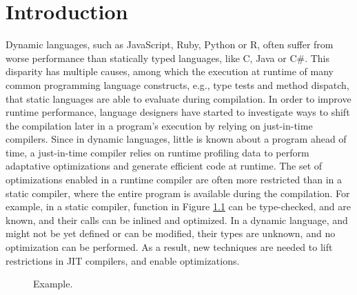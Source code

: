 
\chapter{Introduction} %

\label{Chapter1} %


\newcommand{\keyword}[1]{\textbf{#1}}
\newcommand{\tabhead}[1]{\textbf{#1}}
\newcommand{\code}[1]{\texttt{#1}}
\newcommand{\file}[1]{\texttt{\bfseries#1}}
\newcommand{\option}[1]{\texttt{\itshape#1}}


Dynamic languages, such as JavaScript, Ruby, Python or R, often suffer from worse performance than statically typed languages, like C, Java or C\#.
This disparity has multiple causes, among which the execution at runtime of many common programming language constructs, e.g., type tests and method dispatch, that static languages are able to evaluate during compilation.
In order to improve runtime performance, language designers have started to investigate ways to shift the compilation later in a program's execution by relying on just-in-time compilers.
Since in dynamic languages, little is known about a program ahead of time, a just-in-time compiler relies on runtime profiling data to perform adaptative optimizations and generate efficient code at runtime.
The set of optimizations enabled in a runtime compiler are often more restricted than in a static compiler, where the entire program is available during the compilation.
For example, in a static compiler, function  in Figure \ref{fig:example} can be type-checked,  and  are known, and their calls can be inlined and optimized.
In a dynamic language,  and  might not be yet defined or can be modified, their types are unknown, and no optimization can be performed.
As a result, new techniques are needed to lift restrictions in JIT compilers, and enable optimizations.\\

\begin{figure}[h]
\begin{subfigure}{0.49\linewidth}
\centering
{}
\end{subfigure}
\begin{subfigure}{0.49\linewidth}
\centering
{}
\end{subfigure}
\caption{Example.}
\label{fig:example}
\end{figure}

